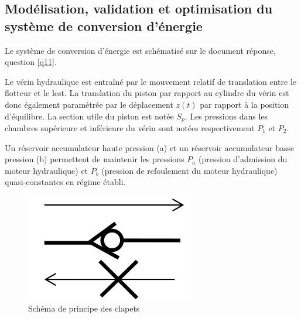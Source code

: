 


\subsection{Modélisation, validation et optimisation du système de conversion d'énergie}

Le système de conversion d'énergie est schématisé sur le document réponse, question \ref{q11}.

Le vérin hydraulique est entraîné par le mouvement relatif de translation entre le flotteur et le lest. La translation du piston par rapport au cylindre du vérin est donc également paramétrée par le déplacement $z(t)$ par rapport à la position d'équilibre. La section utile du piston est notée $S_p$. Les
pressions dans les chambres supérieure et inférieure du vérin sont notées respectivement $P_1$ et $P_2$.

Un réservoir accumulateur haute pression (a) et un réservoir accumulateur basse pression (b) permettent de maintenir les pressions $P_a$ (pression d'admission du moteur hydraulique) et $P_b$ (pression de refoulement du moteur hydraulique) quasi-constantes en régime établi.


\begin{figure}
	\vspace{-0.8cm}
\begin{center}
    \includegraphics[width=0.8\linewidth]{img/fig09}
  \end{center}
    \caption{Schéma de principe des clapets}
\label{fig09}
\end{figure}


